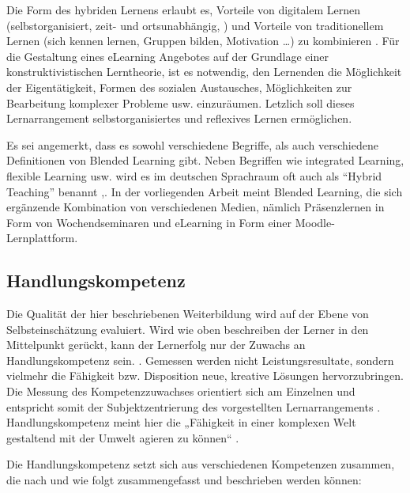 \documentclass[12pt,smallheadings, bibliography=totoc]{scrartcl}
\begin{document}
Die Form des hybriden Lernens erlaubt es, Vorteile von digitalem Lernen
(selbstorganisiert, zeit- und ortsunabhängig, ) und Vorteile von
traditionellem Lernen (sich kennen lernen, Gruppen bilden, Motivation
\ldots) zu kombinieren \parencite{Zumbach2010}. Für die Gestaltung eines
eLearning Angebotes auf der Grundlage einer konstruktivistischen
Lerntheorie, ist es notwendig, den Lernenden die Möglichkeit der
Eigentätigkeit, Formen des sozialen Austausches, Möglichkeiten zur
Bearbeitung komplexer Probleme usw. einzuräumen. Letzlich soll dieses
Lernarrangement selbstorganisiertes und reflexives Lernen ermöglichen.

Es sei angemerkt, dass es sowohl verschiedene Begriffe, als auch
verschiedene Definitionen von Blended Learning gibt. Neben Begriffen wie
integrated Learning, flexible Learning usw. wird es im deutschen
Sprachraum oft auch als \enquote{Hybrid Teaching} benannt
\parencite{Oliver2005},\parencite{kerres2001multimediale}. In der
vorliegenden Arbeit meint Blended Learning, die sich ergänzende
Kombination von verschiedenen Medien, nämlich Präsenzlernen in Form von
Wochendseminaren und eLearning in Form einer Moodle-Lernplattform.

\subsection{Handlungskompetenz}\label{handlungskompetenz}

Die Qualität der hier beschriebenen Weiterbildung wird auf der Ebene von
Selbsteinschätzung evaluiert. Wird wie oben beschreiben der Lerner in
den Mittelpunkt gerückt, kann der Lernerfolg nur der Zuwachs an
Handlungskompetenz sein. \parencite[4]{Ehlers2002}. Gemessen werden
nicht Leistungsresultate, sondern vielmehr die Fähigkeit bzw.
Disposition neue, kreative Lösungen hervorzubringen. Die Messung des
Kompetenzzuwachses orientiert sich am Einzelnen und entspricht somit der
Subjektzentrierung des vorgestellten Lernarrangements
\parencite{ErpenbeckRosenstiel200305}. Handlungskompetenz meint hier die
„Fähigkeit in einer komplexen Welt gestaltend mit der Umwelt agieren zu
können`` \parencite[4]{Ehlers2002}.

Die Handlungskompetenz setzt sich aus verschiedenen Kompetenzen
zusammen, die nach \textcite{ErpenbeckRosenstiel200305} und
\textcite{Braun2008} wie folgt zusammengefasst und beschrieben werden
können:
\end{document}
